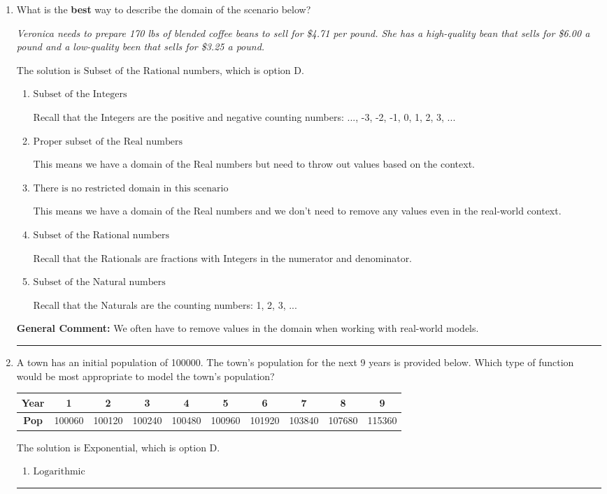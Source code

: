 \documentclass{extbook}[14pt]
\newcommand{\litem}[1]{\item #1

\rule{\textwidth}{0.4pt}}
\begin{document}
\begin{enumerate}\litem{
What is the \textbf{best} way to describe the domain of the scenario below?

\begin{center}
    \textit{ Veronica needs to prepare 170 lbs of blended coffee beans to sell for \$4.71 per pound. She has a high-quality bean that sells for \$6.00 a pound and a low-quality been that sells for \$3.25 a pound. }
\end{center}
The solution is \( \text{Subset of the Rational numbers} \), which is option D.\begin{enumerate}[label=\Alph*.]
\item \( \text{Subset of the Integers} \)

Recall that the Integers are the positive and negative counting numbers: ..., -3, -2, -1, 0, 1, 2, 3, ... 
\item \( \text{Proper subset of the Real numbers} \)

This means we have a domain of the Real numbers but need to throw out values based on the context.
\item \( \text{There is no restricted domain in this scenario} \)

This means we have a domain of the Real numbers and we don't need to remove any values even in the real-world context.
\item \( \text{Subset of the Rational numbers} \)

Recall that the Rationals are fractions with Integers in the numerator and denominator.
\item \( \text{Subset of the Natural numbers} \)

Recall that the Naturals are the counting numbers: 1, 2, 3, ...
\end{enumerate}

\textbf{General Comment:} We often have to remove values in the domain when working with real-world models.
}
\litem{
A town has an initial population of 100000. The town's population for the next 9 years is provided below. Which type of function would be most appropriate to model the town's population?


\begin{tabular}{c|c|c|c|c|c|c|c|c|c}
\textbf{Year} &1 &2 &3 &4 &5 &6 &7 &8 &9\tabularnewline \hline
\textbf{Pop} &100060 &100120 &100240 &100480 &100960 &101920 &103840 &107680 &115360\end{tabular}The solution is \( \text{Exponential} \), which is option D.\begin{enumerate}[label=\Alph*.]
\item \( \text{Logarithmic} \)


\end{enumerate}}
\end{enumerate}
\end{document}
